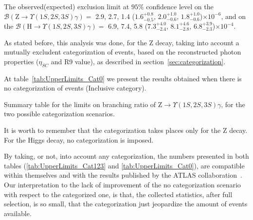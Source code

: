 The observed(expected) exclusion limit at $95\%$ confidence level on the $\mathcal{B}(\mathrm{Z}\to\Upsilon(1S,2S,3S)\gamma)=$ 2.9, 2.7, 1.4 ($1.6^{+0.8}_{-0.5}$,  $2.0^{+1.0}_{-0.6}$, $1.8^{+1.0}_{-0.6}$)$\times 10^{-6}$, and on the $\mathcal{B}(\mathrm{H}\to\Upsilon(1S,2S,3S)\gamma)=$ 6.9, 7.4, 5.8 ($7.3^{+4.0}_{-2.4}$,  $8.1^{+4.6}_{-2.8}$, $6.8^{+3.9}_{-2.3}$)$\times 10^{-4}$.

As stated before, this analysis was done, for the Z decay, taking into account a mutually excludent categorization of events, based on the reconstructed photon properties ($\eta_{SC}$ and R9 value), as described in section~\ref{sec:categorization}. 

At table~\ref{tab:UpperLimits_Cat0} we present the results obtained when there is no categorization of events (Inclusive category).

\begin{table}[ht]
\begin{center}
\caption{Summary table for the limits on branching ratio of $\mathrm{Z}\to\Upsilon(1S,2S,3S)\gamma$, for the two possible categorization scenarios.}
% 

\label{tab:UpperLimits_Cat0}
\end{center}
\end{table}

It is worth to remember that the categorization takes places only for the Z decay. For the Higgs decay, no categorization is imposed.

By taking, or not, into account any categorization, the numbers presented in both tables (\ref{tab:UpperLimits_Cat123} and \ref{tab:UpperLimits_Cat0}), are compatible within themselves and with the results published by the ATLAS collaboration~\cite{atlas_paper_2018:2018txb}. Our interpretation to the lack of improvement of the no categorization scenario with respect to the categorized one, is that, the collected statistics, after full selection, is so small, that the categorization just jeopardize the amount of events available. 

